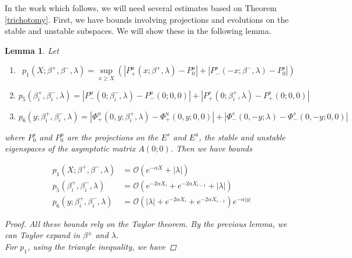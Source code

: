 \documentclass[12pt]{article}
\newtheorem{lemma}{Lemma}
\begin{document}
In the work which follows, we will need several estimates based on Theorem \ref{trichotomy}. First, we have bounds involving projections and evolutions on the stable and unstable subspaces. We will show these in the following lemma.


\begin{lemma}\label{projbounds}
Let

\begin{enumerate}
\item
\begin{equation}\label{p1}
p_1(X; \beta^+, \beta^-, \lambda) = \sup_{x \geq X} (|P^u_+(x; \beta^+, \lambda) - P_0^u| + |P^s_-(-x; \beta^-, \lambda) - P_0^s|)
\end{equation}
\item
\begin{equation}\label{p5}
p_5(\beta_i^+, \beta_i^-, \lambda) = |P^u_-(0; \beta_i^-, \lambda) - P^u_-(0; 0, 0)| + |P^s_+(0; \beta_i^+, \lambda) - P^s_+(0; 0, 0)|
\end{equation}
\item 
\begin{equation}\label{p6}
p_6(y; \beta_i^+, \beta_i^-, \lambda) = |\Phi^u_+(0, y; \beta_i^+, \lambda) - \Phi^u_+(0, y; 0, 0)| + |\Phi^s_-(0, -y; \lambda) - \Phi^s_-(0, -y; 0, 0)| 
\end{equation}

\end{enumerate}

where $P_0^s$ and $P_0^u$ are the projections on the $E^s$ and $E^u$, the stable and unstable eigenspaces of the asymptotic matrix $A(0; 0)$. Then we have bounds

\begin{align}
p_1(X; \beta^+, \beta^-, \lambda) &= \mathcal{O}( e^{-\alpha X } + |\lambda| ) \\
p_5(\beta_i^+, \beta_i^-, \lambda) &= \mathcal{O}(e^{-2 \alpha X_i} + e^{-2 \alpha X_{i-1}} + |\lambda|) \\
p_6(y; \beta_i^+, \beta_i^-, \lambda) &= \mathcal{O}(|\lambda| + e^{-2 \alpha X_i} + e^{-2 \alpha X_{i-1}} ) e^{-\alpha |y|}
\end{align}

\begin{proof}
All these bounds rely on the Taylor theorem. By the previous lemma, we can Taylor expand in $\beta^\pm$ and $\lambda$.\\

For $p_1$, using the triangle inequality, we have


\end{proof}
\end{lemma}
\end{document}
